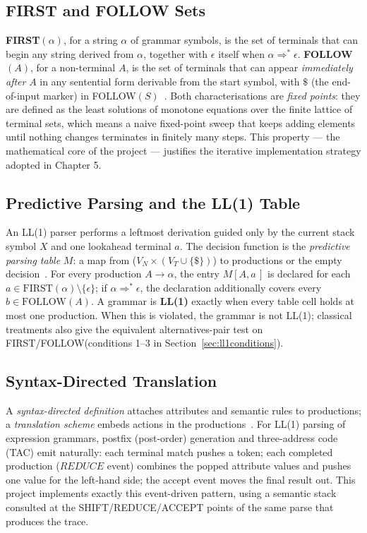 \documentclass[12pt,a4paper,oneside,openany]{report}
\begin{document}
\subsection{FIRST and FOLLOW Sets}
\textbf{FIRST$(\alpha)$}, for a string $\alpha$ of grammar symbols, is the
set of terminals that can begin any string derived from $\alpha$, together
with $\epsilon$ itself when $\alpha \Rightarrow^{*} \epsilon$.
\textbf{FOLLOW$(A)$}, for a non-terminal $A$, is the set of terminals that
can appear \emph{immediately after} $A$ in any sentential form derivable
from the start symbol, with $\$$ (the end-of-input marker) in
FOLLOW$(S)$~\cite{aho2006compilers}. Both characterisations are
\emph{fixed points}: they are defined as the least solutions of monotone
equations over the finite lattice of terminal sets, which means a naive
fixed-point sweep that keeps adding elements until nothing changes
terminates in finitely many steps. This property --- the mathematical
core of the project --- justifies the iterative implementation strategy
adopted in Chapter 5.

\subsection{Predictive Parsing and the LL(1) Table}
An LL(1) parser performs a leftmost derivation guided only by the current
stack symbol $X$ and one lookahead terminal $a$. The decision function is
the \emph{predictive parsing table} $M$: a map from
($V_N \times (V_T \cup \{\$\})$) to productions or the empty
decision~\cite{aho2006compilers, lewis1968}. For every production
$A \to \alpha$, the entry $M[A,a\,]$ is declared for each
$a \in \mathrm{FIRST}(\alpha)\setminus\{\epsilon\}$; if
$\alpha \Rightarrow^{*} \epsilon$, the declaration additionally covers
every $b \in \mathrm{FOLLOW}(A)$. A grammar is \textbf{LL(1)} exactly when
every table cell holds at most one production. When this is violated, the
grammar is not LL(1); classical treatments also give the equivalent
alternatives-pair test on
FIRST/FOLLOW\discretionary{}{}{}(conditions 1--3 in
Section~\ref{sec:ll1conditions}).

\subsection{Syntax-Directed Translation}
A \emph{syntax-directed definition} attaches attributes and semantic rules
to productions; a \emph{translation scheme} embeds actions in the
productions~\cite{aho2006compilers}. For LL(1) parsing of expression
grammars, postfix (post-order) generation and three-address code (TAC)
emit naturally: each terminal match pushes a token; each completed
production ($\mathit{REDUCE}$ event) combines the popped attribute values
and pushes one value for the left-hand side; the accept event moves the
final result out. This project implements exactly this event-driven
pattern, using a semantic stack consulted at the SHIFT/REDUCE/ACCEPT
points of the same parse that produces the trace.
\end{document}
